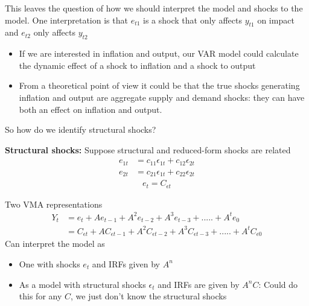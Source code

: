 \documentclass{beamer}
\begin{document}
\begin{frame}
  This leaves the question of how we should interpret the model and shocks to the model. 
  One interpretation is that $e_{t1}$ is a shock that only affects $y_{t1}$ on impact and $e_{t2}$ only affects $y_{t2}$
  \begin{itemize}
    \item If we are interested in inflation and output, our VAR model could calculate the dynamic effect of a shock to inflation and a shock to output
    \item From a theoretical point of view it could be that the true shocks generating inflation and output are aggregate supply and demand shocks: they can have both an effect on inflation and output.
\end{itemize}
\medskip
So how do we identify structural shocks?  
\end{frame}

\begin{frame}
  \textbf{Structural shocks:} Suppose structural and reduced-form shocks are related
  \begin{align}
      e_{1t}&= c_{11}\epsilon_{1t} + c_{12}\epsilon_{2t}\\ \nonumber
      e_{2t}&= c_{21}\epsilon_{1t} + c_{22}\epsilon_{2t}  
  \end{align}
  \begin{align}  
      e_t= C_{\epsilon t} 
  \end{align}
\end{frame}

\begin{frame}
  Two VMA representations
\begin{align}
  Y_t &= e_t + Ae_{t-1} + A^2e_{t-2} + A^3e_{t-3} + ..... + A^te_0\\
      &= C_{\epsilon t} +  AC_{\epsilon t-1} + A^2C_{\epsilon t-2} + A^3C_{\epsilon t-3} + ..... + A^tC_{\epsilon 0}
\end{align}
\medskip
Can interpret the model as
\begin{itemize}
  \item One with shocks $e_t$ and IRFs given by $A^n$
  \item As a model with structural shocks $\epsilon_t$ and IRFs are given by $A^nC$: Could do this for any $C$, we just don't know the structural shocks
\end{itemize}
\end{frame}
\end{document}
